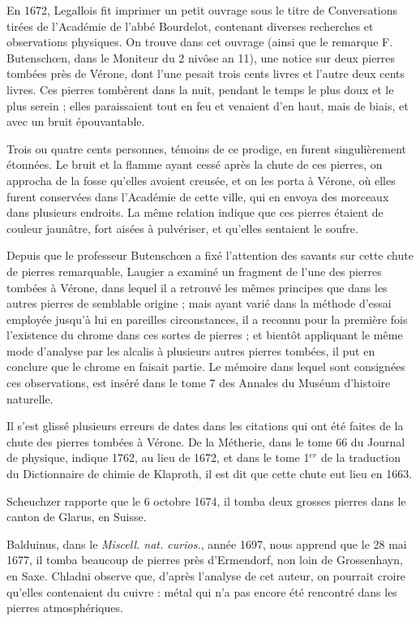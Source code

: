 \documentclass[a4paper, 12pt, oneside, french]{article}
\begin{document}
En 1672, Legallois fit imprimer un petit ouvrage sous le titre de Conversations tirées de l'Académie de l'abbé Bourdelot, contenant diverses recherches et observations physiques. On trouve dans cet ouvrage (ainsi que le remarque F. Butenschœn, dans le Moniteur du 2 nivôse an 11), une notice sur deux pierres tombées près de Vérone, dont l'une pesait trois cents livres et l'autre deux cents livres. Ces pierres tombèrent dans la nuit, pendant le temps le plus doux et le plus serein ; elles paraissaient tout en feu et venaient d'en haut, mais de biais, et avec un bruit épouvantable.

Trois ou quatre cents personnes, témoins de ce prodige, en furent singulièrement étonnées. Le bruit et la flamme ayant cessé après la chute de ces pierres, on approcha de la fosse qu'elles avoient creusée, et on les porta à Vérone, où elles furent conservées dans l'Académie de cette ville, qui en envoya des morceaux dans plusieurs endroits. La même relation indique que ces pierres étaient de couleur jaunâtre, fort aisées à pulvériser, et qu'elles sentaient le soufre.

Depuis que le professeur Butenschœn a fixé l'attention des savants sur cette chute de pierres remarquable, Laugier a examiné un fragment de l'une des pierres tombées à Vérone, dans lequel il a retrouvé les mêmes principes que dans les autres pierres de semblable origine ; mais ayant varié dans la méthode d'essai employée jusqu'à lui en pareilles circonstances, il a reconnu pour la première fois l'existence du chrome dans ces sortes de pierres ; et bientôt appliquant le même mode d'analyse par les alcalis à plusieurs autres pierres tombées, il put en conclure que le chrome en faisait partie. Le mémoire dans lequel sont consignées ces observations, est inséré dans le tome 7 des Annales du Muséum d'histoire naturelle.

Il s'est glissé plusieurs erreurs de dates dans les citations qui ont été faites de la chute des pierres tombées à Vérone. De la Métherie, dans le tome 66 du Journal de physique, indique 1762, au lieu de 1672, et dans le tome 1$^{er}$ de la traduction du Dictionnaire de chimie de Klaproth, il est dit que cette chute eut lieu en 1663.

Scheuchzer rapporte que le 6 octobre 1674, il tomba deux grosses pierres dans le canton de Glarus, en Suisse.

Balduinus, dans le \emph{Miscell. nat. curios.}, année 1697, nous apprend que le 28 mai 1677, il tomba beaucoup de pierres près d'Ermendorf, non loin de Grossenhayn, en Saxe. Chladni observe que, d'après l'analyse de cet auteur, on pourrait croire qu'elles contenaient du cuivre : métal qui n'a pas encore été rencontré dans les pierres atmosphériques.
\end{document}
